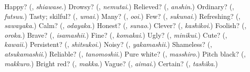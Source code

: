 \begin{tcolorbox}[breakable,colback=teal!4,colframe=teal!35!black,title={Before you move on}]
Happy? (\textbf{}, \emph{shiawase}.) Drowsy? (\textbf{}, \emph{nemutai}.) Relieved? (\textbf{}, \emph{anshin}.) Ordinary? (\textbf{}, \emph{futsuu}.) Tasty; skilful? (\textbf{}, \emph{umai}.) Many? (\textbf{}, \emph{ooi}.) Few? (\textbf{}, \emph{sukunai}.) Refreshing? (\textbf{}, \emph{sawayaka}.) Calm? (\textbf{}, \emph{odayaka}.) Honest? (\textbf{}, \emph{sunao}.) Clever? (\textbf{}, \emph{kashikoi}.) Foolish? (\textbf{}, \emph{oroka}.) Brave? (\textbf{}, \emph{isamashii}.) Fine? (\textbf{}, \emph{komakai}.) Ugly? (\textbf{}, \emph{minikui}.) Cute? (\textbf{}, \emph{kawaii}.) Persistent? (\textbf{}, \emph{shitsukoi}.) Noisy? (\textbf{}, \emph{yakamashii}.) Shameless? (\textbf{}, \emph{atsukamashii}.) Reliable? (\textbf{}, \emph{tanomoshii}.) Pure white? (\textbf{}, \emph{masshiro}.) Pitch black? (\textbf{}, \emph{makkuro}.) Bright red? (\textbf{}, \emph{makka}.) Vague? (\textbf{}, \emph{aimai}.) Certain? (\textbf{}, \emph{tashika}.)
\end{tcolorbox}

